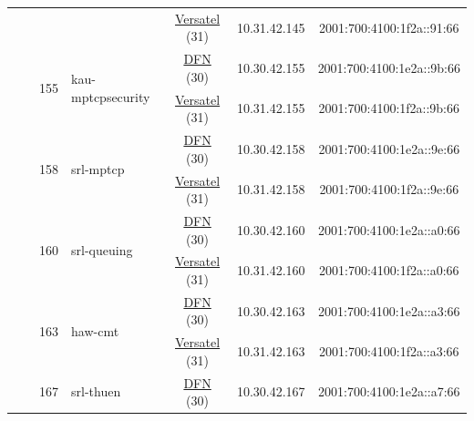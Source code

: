 \begin{small}
\begin{center}
\begin{longtable}{|c|c|c|c|c|c|c|c|}
  &  &  &  & \multicolumn{2}{|c|}{\tiny{\href{http://www.versatel.de}{Versatel} (31)}} & \tiny{10.31.42.145} & \tiny{2001:700:4100:1f2a::91:66} \\* \cline{3-3}\cline{4-4}\cline{5-5}\cline{6-6}\cline{7-7}\cline{8-8}
  &  & \multirow{2}{*}{\tiny{155}} & \multicolumn{1}{|l|}{\multirow{2}{*}{\tiny{kau-mptcpsecurity}}} & \multicolumn{2}{|c|}{\tiny{\href{https://www.dfn.de}{DFN} (30)}} & \tiny{10.30.42.155} & \tiny{2001:700:4100:1e2a::9b:66} \\* \cline{5-5}\cline{6-6}\cline{7-7}\cline{8-8}
  &  &  &  & \multicolumn{2}{|c|}{\tiny{\href{http://www.versatel.de}{Versatel} (31)}} & \tiny{10.31.42.155} & \tiny{2001:700:4100:1f2a::9b:66} \\* \cline{3-3}\cline{4-4}\cline{5-5}\cline{6-6}\cline{7-7}\cline{8-8}
  &  & \multirow{2}{*}{\tiny{158}} & \multicolumn{1}{|l|}{\multirow{2}{*}{\tiny{srl-mptcp}}} & \multicolumn{2}{|c|}{\tiny{\href{https://www.dfn.de}{DFN} (30)}} & \tiny{10.30.42.158} & \tiny{2001:700:4100:1e2a::9e:66} \\* \cline{5-5}\cline{6-6}\cline{7-7}\cline{8-8}
  &  &  &  & \multicolumn{2}{|c|}{\tiny{\href{http://www.versatel.de}{Versatel} (31)}} & \tiny{10.31.42.158} & \tiny{2001:700:4100:1f2a::9e:66} \\* \cline{3-3}\cline{4-4}\cline{5-5}\cline{6-6}\cline{7-7}\cline{8-8}
  &  & \multirow{2}{*}{\tiny{160}} & \multicolumn{1}{|l|}{\multirow{2}{*}{\tiny{srl-queuing}}} & \multicolumn{2}{|c|}{\tiny{\href{https://www.dfn.de}{DFN} (30)}} & \tiny{10.30.42.160} & \tiny{2001:700:4100:1e2a::a0:66} \\* \cline{5-5}\cline{6-6}\cline{7-7}\cline{8-8}
  &  &  &  & \multicolumn{2}{|c|}{\tiny{\href{http://www.versatel.de}{Versatel} (31)}} & \tiny{10.31.42.160} & \tiny{2001:700:4100:1f2a::a0:66} \\* \cline{3-3}\cline{4-4}\cline{5-5}\cline{6-6}\cline{7-7}\cline{8-8}
  &  & \multirow{2}{*}{\tiny{163}} & \multicolumn{1}{|l|}{\multirow{2}{*}{\tiny{haw-cmt}}} & \multicolumn{2}{|c|}{\tiny{\href{https://www.dfn.de}{DFN} (30)}} & \tiny{10.30.42.163} & \tiny{2001:700:4100:1e2a::a3:66} \\* \cline{5-5}\cline{6-6}\cline{7-7}\cline{8-8}
  &  &  &  & \multicolumn{2}{|c|}{\tiny{\href{http://www.versatel.de}{Versatel} (31)}} & \tiny{10.31.42.163} & \tiny{2001:700:4100:1f2a::a3:66} \\* \cline{3-3}\cline{4-4}\cline{5-5}\cline{6-6}\cline{7-7}\cline{8-8}
  &  & \multirow{2}{*}{\tiny{167}} & \multicolumn{1}{|l|}{\multirow{2}{*}{\tiny{srl-thuen}}} & \multicolumn{2}{|c|}{\tiny{\href{https://www.dfn.de}{DFN} (30)}} & \tiny{10.30.42.167} & \tiny{2001:700:4100:1e2a::a7:66} \\* \cline{5-5}\cline{6-6}\cline{7-7}\cline{8-8}

\end{longtable}
\end{center}
\end{small}
